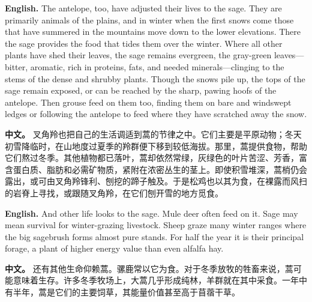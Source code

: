 \noindent\textbf{English.} The antelope, too, have adjusted their lives to the sage. They are primarily animals of the plains, and in winter when the first snows come those that have summered in the mountains move down to the lower elevations. There the sage provides the food that tides them over the winter. Where all other plants have shed their leaves, the sage remains evergreen, the gray-green leaves---bitter, aromatic, rich in proteins, fats, and needed minerals---clinging to the stems of the dense and shrubby plants. Though the snows pile up, the tops of the sage remain exposed, or can be reached by the sharp, pawing hoofs of the antelope. Then grouse feed on them too, finding them on bare and windswept ledges or following the antelope to feed where they have scratched away the snow.
\par
\noindent\textbf{中文。} 叉角羚也把自己的生活调适到蒿的节律之中。它们主要是平原动物；冬天初雪降临时，在山地度过夏季的羚群便下移到较低海拔。那里，蒿提供食物，帮助它们熬过冬季。其他植物都已落叶，蒿却依然常绿，灰绿色的叶片苦涩、芳香，富含蛋白质、脂肪和必需矿物质，紧附在浓密丛生的茎上。即使积雪堆深，蒿梢仍会露出，或可由叉角羚锋利、刨挖的蹄子触及。于是松鸡也以其为食，在裸露而风扫的岩脊上寻找，或跟随叉角羚，在它们刨开雪的地方觅食。
\par\medskip

\noindent\textbf{English.} And other life looks to the sage. Mule deer often feed on it. Sage may mean survival for winter-grazing livestock. Sheep graze many winter ranges where the big sagebrush forms almost pure stands. For half the year it is their principal forage, a plant of higher energy value than even alfalfa hay.
\par
\noindent\textbf{中文。} 还有其他生命仰赖蒿。骡鹿常以它为食。对于冬季放牧的牲畜来说，蒿可能意味着生存。许多冬季牧场上，大蒿几乎形成纯林，羊群就在其中采食。一年中有半年，蒿是它们的主要饲草，其能量价值甚至高于苜蓿干草。
\par\medskip

